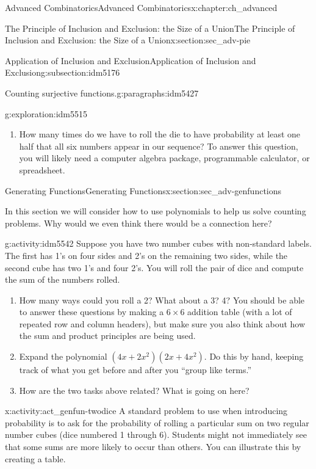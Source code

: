 \documentclass[oneside,10pt,]{book}
\numberwithin{equation}{chapter}
\begin{document}
\begin{chapterptx}{Advanced Combinatorics}{}{Advanced Combinatorics}{}{}{x:chapter:ch_advanced}
\begin{sectionptx}{The Principle of Inclusion and Exclusion: the Size of a Union}{}{The Principle of Inclusion and Exclusion: the Size of a Union}{}{}{x:section:sec_adv-pie}
\begin{subsectionptx}{Application of Inclusion and Exclusion}{}{Application of Inclusion and Exclusion}{}{}{g:subsection:idm5176}
\begin{paragraphs}{Counting surjective functions.}{g:paragraphs:idm5427}
\begin{exploration}{}{g:exploration:idm5515}
\begin{enumerate}[font=\bfseries,label=(\alph*),ref=\alph*]
\item{}How many times do we have to roll the die to have probability at least one half that all six numbers appear in our sequence? To answer this question, you will likely need a computer algebra package, programmable calculator, or spreadsheet.%
\end{enumerate}
\end{exploration}
\end{paragraphs}%
\end{subsectionptx}
\end{sectionptx}
%
%
\typeout{************************************************}
\typeout{************************************************}
%
\begin{sectionptx}{Generating Functions}{}{Generating Functions}{}{}{x:section:sec_adv-genfunctions}
\begin{introduction}{}%
In this section we will consider how to use polynomials to help us solve counting problems.  Why would we even think there would be a connection here?%
\begin{activity}{}{g:activity:idm5542}%
Suppose you have two number cubes with non-standard labels.  The first has 1's on four sides and 2's on the remaining two sides, while the second cube has two 1's and four 2's. You will roll the pair of dice and compute the sum of the numbers rolled.%
\begin{enumerate}[font=\bfseries,label=(\alph*),ref=\alph*]
\item{}How many ways could you roll a 2?  What about a 3?  4?  You should be able to answer these questions by making a \(6\times 6\) addition table (with a lot of repeated row and column headers), but make sure you also think about how the sum and product principles are being used.%
\item{}Expand the polynomial \((4x + 2x^2)(2x + 4x^2)\).  Do this by hand, keeping track of what you get before and after you ``group like terms.''%
\item{}How are the two tasks above related?  What is going on here?%
\end{enumerate}
\end{activity}
\begin{activity}{}{x:activity:act_genfun-twodice}%
A standard problem to use when introducing probability is to ask for the probability of rolling a particular sum on two regular number cubes (dice numbered 1 through 6).  Students might not immediately see that some sums are more likely to occur than others.  You can illustrate this by creating a table.%

\end{activity}
\end{introduction}
\end{sectionptx}
\end{chapterptx}
\end{document}
